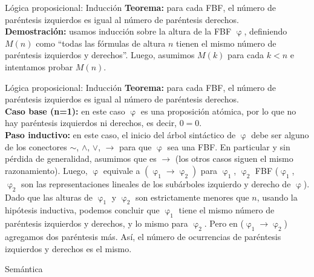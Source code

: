 \documentclass{beamer}
\begin{document}
\begin{frame}{Lógica proposicional: Inducción}
  \textbf{Teorema:} para cada FBF, el número de paréntesis izquierdos es igual al número de paréntesis derechos.\\

  \textbf{Demostración:} usamos inducción sobre la altura de la FBF $\upvarphi$,
  definiendo $M(n)$ como “todas las fórmulas de altura $n$ tienen el mismo
  número de paréntesis izquierdos y derechos”. Luego, asumimos $M(k)$ para cada
  $k < n$ e intentamos probar $M(n)$.
\end{frame}


\begin{frame}{Lógica proposicional: Inducción}
  \textbf{Teorema:} para cada FBF, el número de paréntesis izquierdos es igual al número de paréntesis derechos.\\

  \textbf{Caso base (n=1):} en este caso $\upvarphi$ es una proposición atómica,
  por lo que no hay paréntesis izquierdos ni derechos, es decir, $0 = 0$.\\

  \textbf{Paso inductivo:} en este caso, el inicio del árbol sintáctico de
  $\upvarphi$ debe ser alguno de los conectores $\sim$, $\land$, $\vee$,
  $\rightarrow$ para que $\upvarphi$ sea una FBF. En particular y sin pérdida de
  generalidad, asumimos que es $\rightarrow$ (los otros casos siguen el mismo
  razonamiento). Luego, $\upvarphi$ equivale a
  $(\upvarphi_{1} \rightarrow \upvarphi_{2})$ para $\upvarphi_{1}$,
  $\upvarphi_{2}$ FBF ($\upvarphi_{1}$, $\upvarphi_{2}$ son las representaciones
  lineales de los subárboles izquierdo y derecho de $\upvarphi$). Dado que las
  alturas de $\upvarphi_{1}$ y $\upvarphi_{2}$ son estrictamente menores que
  $n$, usando la hipótesis inductiva, podemos concluir que $\upvarphi_{1}$ tiene
  el mismo número de paréntesis izquierdos y derechos, y lo mismo para
  $\upvarphi_{2}$. Pero en ($\upvarphi_{1} \rightarrow \upvarphi_{2}$) agregamos
  dos paréntesis más. Así, el número de ocurrencias de paréntesis izquierdos y
  derechos es el mismo.
\end{frame}


\begin{frame}[plain,c]
  \vspace{1cm}
  \begin{center}
    \Huge Semántica
  \end{center}
\end{frame}
\end{document}
